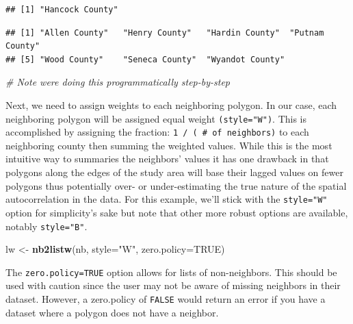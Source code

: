 \documentclass[]{article}
\newenvironment{Shaded}{\begin{snugshade}}{\end{snugshade}}
\newcommand{\AttributeTok}[1]{\textcolor[rgb]{0.13,0.29,0.53}{#1}}
\newcommand{\CommentTok}[1]{\textcolor[rgb]{0.56,0.35,0.01}{\textit{#1}}}
\newcommand{\ConstantTok}[1]{\textcolor[rgb]{0.56,0.35,0.01}{#1}}
\newcommand{\DecValTok}[1]{\textcolor[rgb]{0.00,0.00,0.81}{#1}}
\newcommand{\FunctionTok}[1]{\textcolor[rgb]{0.13,0.29,0.53}{\textbf{#1}}}
\newcommand{\NormalTok}[1]{#1}
\newcommand{\OtherTok}[1]{\textcolor[rgb]{0.56,0.35,0.01}{#1}}
\newcommand{\SpecialCharTok}[1]{\textcolor[rgb]{0.81,0.36,0.00}{\textbf{#1}}}
\newcommand{\StringTok}[1]{\textcolor[rgb]{0.31,0.60,0.02}{#1}}
\begin{document}
\begin{verbatim}
## [1] "Hancock County"
\end{verbatim}

\begin{Shaded}
\end{Shaded}

\begin{verbatim}
## [1] "Allen County"   "Henry County"   "Hardin County"  "Putnam County" 
## [5] "Wood County"    "Seneca County"  "Wyandot County"
\end{verbatim}

\begin{Shaded}
\begin{Highlighting}[]
\CommentTok{\# Note we\textquotesingle{}re doing this programmatically step{-}by{-}step}
\end{Highlighting}
\end{Shaded}

Next, we need to assign weights to each neighboring polygon. In our
case, each neighboring polygon will be assigned equal weight
\texttt{(style="W")}. This is accomplished by assigning the fraction:
\texttt{1\ /\ (\ \#\ of\ neighbors)} to each neighboring county then
summing the weighted values. While this is the most intuitive way to
summaries the neighbors' values it has one drawback in that polygons
along the edges of the study area will base their lagged values on fewer
polygons thus potentially over- or under-estimating the true nature of
the spatial autocorrelation in the data. For this example, we'll stick
with the \texttt{style="W"} option for simplicity's sake but note that
other more robust options are available, notably \texttt{style="B"}.

\begin{Shaded}
\begin{Highlighting}[]
\NormalTok{lw }\OtherTok{\textless{}{-}} \FunctionTok{nb2listw}\NormalTok{(nb, }\AttributeTok{style=}\StringTok{"W"}\NormalTok{, }\AttributeTok{zero.policy=}\ConstantTok{TRUE}\NormalTok{)}
\end{Highlighting}
\end{Shaded}

The \texttt{zero.policy=TRUE} option allows for lists of non-neighbors.
This should be used with caution since the user may not be aware of
missing neighbors in their dataset. However, a zero.policy of
\texttt{FALSE} would return an error if you have a dataset where a
polygon does not have a neighbor.
\end{document}
